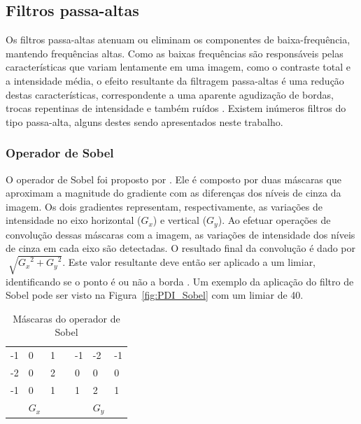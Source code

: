 \documentclass[12pt,oneside,a4paper,english,french,spanish,brazil,]{abntex2}
\begin{document}
\subsection{Filtros passa-altas}

Os filtros passa-altas atenuam ou eliminam os componentes de baixa-frequência, mantendo frequências altas. Como as baixas frequências são responsáveis pelas características que variam lentamente em uma imagem, como o contraste total e a intensidade média, o efeito resultante da filtragem passa-altas é uma redução destas características, correspondente a uma aparente agudização de bordas, trocas repentinas de intensidade e também ruídos \cite{gonzalez:2012}. Existem inúmeros filtros do tipo passa-alta, alguns destes sendo apresentados neste trabalho.

\subsubsection{Operador de Sobel}

O operador de Sobel foi proposto por \citet{sobel:1968}. Ele é composto por duas máscaras que aproximam a magnitude do gradiente com as diferenças dos níveis de cinza da imagem. Os dois gradientes representam, respectivamente, as variações de intensidade no eixo horizontal (\(G_x\)) e vertical (\(G_y\)). Ao efetuar operações de convolução dessas máscaras com a imagem, as variações de intensidade dos níveis de cinza em cada eixo são detectadas. O resultado final da convolução é dado por \(\sqrt[]{{G_x}^2 + {G_y}^2}\). Este valor resultante deve então ser aplicado a um limiar, identificando se o ponto é ou não a borda \cite{pedrini:2008}. Um exemplo da aplicação do filtro de Sobel pode ser visto na Figura~\ref{fig:PDI_Sobel} com um limiar de 40.

\begin{table}
\centering
\caption{Máscaras do operador de Sobel}
\label{tab:Sobel}
\begin{tabular}{lllllll}
\cline{1-3} \cline{5-7}
\multicolumn{1}{|l|}{-1} & \multicolumn{1}{l|}{0} & \multicolumn{1}{l|}{1} & \multicolumn{1}{l|}{} & \multicolumn{1}{l|}{-1} & \multicolumn{1}{l|}{-2} & \multicolumn{1}{l|}{-1} \\ \cline{1-3} \cline{5-7} 
\multicolumn{1}{|l|}{-2} & \multicolumn{1}{l|}{0} & \multicolumn{1}{l|}{2} & \multicolumn{1}{l|}{} & \multicolumn{1}{l|}{0}  & \multicolumn{1}{l|}{0}  & \multicolumn{1}{l|}{0}  \\ \cline{1-3} \cline{5-7} 
\multicolumn{1}{|l|}{-1} & \multicolumn{1}{l|}{0} & \multicolumn{1}{l|}{1} & \multicolumn{1}{l|}{} & \multicolumn{1}{l|}{1}  & \multicolumn{1}{l|}{2}  & \multicolumn{1}{l|}{1}  \\ \cline{1-3} \cline{5-7} 
                         & \(G_x\)                   &                        &                       &                         & \(G_y\)                    &                        
\end{tabular}
\end{table}
\end{document}
